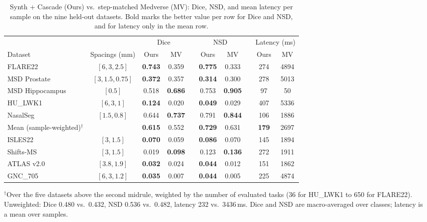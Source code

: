 \documentclass[hidelinks, a4paper, 12pt, ngerman, english]{article}  %
\begin{document}
\begin{table}[t]
  \centering
  \small
  \caption{Synth + Cascade (Ours) vs.\ step-matched Medverse (MV): Dice, NSD,
  and mean latency per sample on the nine held-out datasets. Bold marks the
  better value per row for Dice and NSD, and for latency only in the mean
  row.}
  \label{tab:synth-cascade-medverse-final}
  \begin{tabular}{@{}lccc c cc c cc@{}}
    \toprule
    & & \multicolumn{2}{c}{Dice} & & \multicolumn{2}{c}{NSD} & & \multicolumn{2}{c}{Latency (ms)} \\
    \cmidrule(lr){3-4} \cmidrule(lr){6-7} \cmidrule(lr){9-10}
    Dataset & Spacings (mm) & Ours & MV & & Ours & MV & & Ours & MV \\
    \midrule
    FLARE22         & $[6, 3, 2.5]$    & \textbf{0.743} & 0.359 & & \textbf{0.775} & 0.333 & & 274 & 4894 \\
    MSD Prostate    & $[3, 1.5, 0.75]$ & \textbf{0.372} & 0.357 & & \textbf{0.314} & 0.300 & & 278 & 5013 \\
    MSD Hippocampus & $[0.5]$          & 0.518 & \textbf{0.686} & & 0.753 & \textbf{0.905} & & 97  & 50   \\
    HU\_LWK1        & $[6, 3, 1]$      & \textbf{0.124} & 0.020 & & \textbf{0.049} & 0.029 & & 407 & 5336 \\
    NasalSeg        & $[1.5, 0.8]$     & 0.644 & \textbf{0.737} & & 0.791 & \textbf{0.844} & & 106 & 1886 \\
    \midrule
    Mean (sample-weighted)$^{\dagger}$ & & \textbf{0.615} & 0.552 & & \textbf{0.729} & 0.631 & & \textbf{179} & 2697 \\
    \midrule
    ISLES22         & $[3, 1.5]$       & \textbf{0.070} & 0.059 & & \textbf{0.086} & 0.070 & & 145 & 1894 \\
    Shifts-MS       & $[3, 1.5]$       & 0.019 & \textbf{0.098} & & 0.123 & \textbf{0.136} & & 272 & 1911 \\
    ATLAS v2.0      & $[3.8, 1.9]$     & \textbf{0.032} & 0.024 & & \textbf{0.044} & 0.012 & & 151 & 1862 \\
    GNC\_705        & $[6, 3, 1.2]$    & \textbf{0.035} & 0.007 & & \textbf{0.044} & 0.005 & & 225 & 4874 \\
    \bottomrule
  \end{tabular}
  \par\vspace{0.5em}
  \raggedright\footnotesize
  $^{\dagger}$Over the five datasets above the second midrule, weighted by the
  number of evaluated tasks (36 for HU\_LWK1 to 650 for FLARE22). Unweighted:
  Dice 0.480 vs.\ 0.432, NSD 0.536 vs.\ 0.482, latency 232 vs.\ 3436\,ms. Dice
  and NSD are macro-averaged over classes; latency is a mean over samples.
\end{table}%
\end{document}
